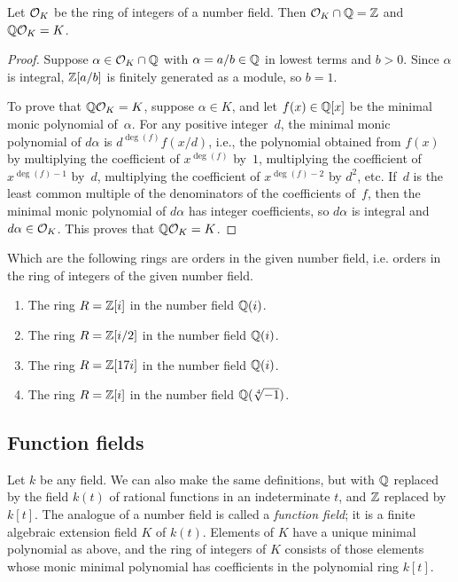 \begin{lemma}\label{lem:intq}
	Let $\mathcal{O}_K$ be the ring of integers of a number field.
	Then $\mathcal{O}_K\cap \mathbb{Q} = \mathbb{Z}$ and $\mathbb{Q}\mathcal{O}_K = K$.
\end{lemma}
\begin{proof}
	Suppose $\alpha\in \mathcal{O}_K\cap\mathbb{Q}$ with $\alpha=a/b \in \mathbb{Q}$ in lowest
	terms and $b>0$.  Since $\alpha$ is integral, $\mathbb{Z}[a/b]$ is finitely
	generated as a module, so $b=1$.
	
	To prove that $\mathbb{Q}\mathcal{O}_K=K$, suppose $\alpha\in K$, and let
	$f(x)\in\mathbb{Q}[x]$ be the minimal monic polynomial of~$\alpha$.  For any
	positive integer~$d$, the minimal monic polynomial of $d\alpha$ is
	$d^{\deg(f)}f(x/d)$, i.e., the polynomial obtained from $f(x)$ by
	multiplying the coefficient of $x^{\deg(f)}$ by~$1$, multiplying the
	coefficient of $x^{\deg(f)-1}$ by~$d$, multiplying the coefficient of
	$x^{\deg(f)-2}$ by $d^2$, etc.  If~$d$ is the least common multiple of
	the denominators of the coefficients of~$f$, then the minimal monic
	polynomial of $d\alpha$ has integer coefficients, so $d\alpha$ is
	integral and $d\alpha\in \mathcal{O}_K$.  This proves that $\mathbb{Q}\mathcal{O}_K = K$.
\end{proof}

\begin{exercise}
	Which are the following rings are orders in the given
	number field, i.e. orders in the ring of integers of the
	given number field.
	\begin{enumerate}[label=(\emph{\alph*})]
		\item The ring $R = \mathbb{Z}[i]$ in the number field $\mathbb{Q}(i)$.
		\item The ring $R = \mathbb{Z}[i/2]$ in the number field $\mathbb{Q}(i)$.
		\item The ring $R = \mathbb{Z}[17i]$ in the number field $\mathbb{Q}(i)$.
		\item The ring $R = \mathbb{Z}[i]$ in the number field $\mathbb{Q}(\sqrt[4]{-1})$.
	\end{enumerate}
\end{exercise}

\subsection{Function fields}
Let $k$ be any field.  We can also make the same definitions, but with $\mathbb{Q}$
replaced by the field $k(t)$ of rational functions in an indeterminate
$t$, and $\mathbb{Z}$ replaced by $k[t]$.
The analogue of a number field is called a {\em function field}; it is
a finite algebraic extension field $K$ of $k(t)$.  Elements of $K$
have a unique minimal polynomial as above, and the ring of integers of
$K$ consists of those elements whose monic minimal polynomial has
coefficients in the polynomial ring $k[t]$.

